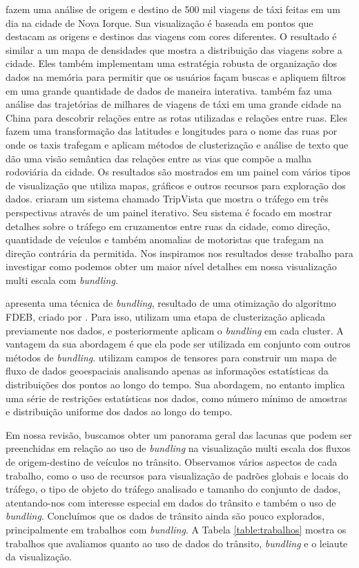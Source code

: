 \citet{Ferreira2013} fazem uma análise de origem e destino de 500 mil viagens
de táxi feitas em um dia na cidade de Nova Iorque. Sua visualização é baseada
em pontos que destacam as origens e destinos das viagens com cores diferentes.
O resultado é similar a um mapa de densidades que mostra a distribuição das
viagens sobre a cidade. Eles também implementam uma estratégia robusta de
organização dos dados na memória para permitir que os usuários façam buscas e
apliquem filtros em uma grande quantidade de dados de maneira interativa.
\citet{Chu2014} também faz uma análise das trajetórias de milhares de viagens
de táxi em uma grande cidade na China para descobrir relações entre as rotas
utilizadas e relações entre ruas. Eles fazem uma transformação das latitudes e
longitudes para o nome das ruas por onde os taxis trafegam e aplicam métodos de
clusterização e análise de texto que dão uma visão semântica das relações entre
as vias que compõe a malha rodoviária da cidade. Os resultados são mostrados em
um painel com vários tipos de visualização que utiliza mapas, gráficos e outros
recursos para exploração dos dados. \citet{Guo2011} criaram um sistema chamado
TripVista que mostra o tráfego em três perspectivas através de um painel iterativo.
Seu sistema é focado em mostrar detalhes sobre o tráfego em cruzamentos entre
ruas da cidade, como direção, quantidade de veículos e também anomalias de motoristas
que trafegam na direção contrária da permitida. Nos inspiramos nos resultados
desse trabalho para investigar como podemos obter um maior nível detalhes em
nossa visualização multi escala com \emph{bundling}.

\citet{Anita2017} apresenta uma técnica de \emph{bundling}, resultado de
uma otimização do algoritmo FDEB, criado por \citet{Selassie2011}. Para isso,
utilizam uma etapa de clusterização aplicada previamente nos dados, e
posteriormente aplicam o \emph{bundling} em cada cluster. A vantagem da sua
abordagem é que ela pode ser utilizada em conjunto com outros métodos de
\emph{bundling}. \citet{Kim2018} utilizam campos de tensores para construir
um mapa de fluxo de dados geoespaciais analisando apenas as informações
estatísticas da distribuições dos pontos ao longo do tempo. Sua abordagem, no entanto
implica uma série de restrições estatísticas nos dados, como número mínimo
de amostras e distribuição uniforme dos dados ao longo do tempo.

  Em nossa revisão, buscamos obter um panorama geral das lacunas que podem ser
preenchidas em relação ao uso de \emph{bundling} na visualização multi escala
dos fluxos de origem-destino de veículos no trânsito. Observamos vários aspectos de cada trabalho, como
o uso de recursos para visualização de padrões globais e locais do tráfego, o tipo de
objeto do tráfego analisado e tamanho do conjunto de dados, atentando-nos com interesse
especial em dados do trânsito e também o uso de \emph{bundling}. Concluímos que os dados de
trânsito ainda são pouco explorados, principalmente em trabalhos com
\emph{bundling}. A Tabela \ref{table:trabalhos} mostra os trabalhos que avaliamos
quanto ao uso de dados do trânsito, \emph{bundling} e o leiaute da visualização.

